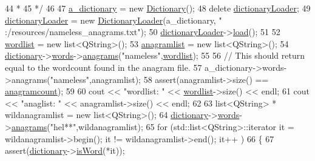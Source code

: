 \begin{DoxyCode}
44 \textcolor{comment}{         *}
45 \textcolor{comment}{         */}
46 
47         \hyperlink{class_unit_test_a81579d68baa8575bdf1625a0642eadf8}{a\_dictionary} = \textcolor{keyword}{new} \hyperlink{class_dictionary}{Dictionary}();
48         \textcolor{keyword}{delete} \hyperlink{class_unit_test_a9cf46138e9006b18b978f6a3126c8c50}{dictionaryLoader};
49         \hyperlink{class_unit_test_a9cf46138e9006b18b978f6a3126c8c50}{dictionaryLoader} = \textcolor{keyword}{new} \hyperlink{class_dictionary_loader}{DictionaryLoader}(a\_dictionary, \textcolor{stringliteral}{"
      :/resources/nameless\_anagrams.txt"});
50         \hyperlink{class_unit_test_a9cf46138e9006b18b978f6a3126c8c50}{dictionaryLoader}->\hyperlink{class_dictionary_loader_a1441785d7f5a848be0d7b7f432e338f8}{load}();
51 
52         \hyperlink{class_unit_test_aeb6acd51a206123112b000f6520ac25b}{wordlist} = \textcolor{keyword}{new} list<QString>();
53         \hyperlink{class_unit_test_aeb6e626c75d7caa5100aa605831a439f}{anagramlist} = \textcolor{keyword}{new} list<QString>();
54         \hyperlink{class_unit_test_a09902f0cb75bf2c03c56912ecd4682aa}{dictionary}->\hyperlink{class_dictionary_ac6c08127a37d8131fb8fb1e738406e85}{words}->\hyperlink{class_trie_aa42c01330538b67e0aff76068f02a8f7}{anagrams}(\textcolor{stringliteral}{"nameless"},\hyperlink{class_unit_test_aeb6acd51a206123112b000f6520ac25b}{wordlist});
55 
56         \textcolor{comment}{// This should return equal to the wordcount found in the anagram file.}
57         a\_dictionary->words->anagrams(\textcolor{stringliteral}{"nameless"},anagramlist);
58         assert(anagramlist->size() == \hyperlink{class_unit_test_a9e7b7ee73cb31ffb5b98bbb69a0aa999}{anagramcount});
59 
60         cout << \textcolor{stringliteral}{"wordlist: "} << \hyperlink{class_unit_test_aeb6acd51a206123112b000f6520ac25b}{wordlist}->size() << endl;
61         cout << \textcolor{stringliteral}{"anaglist: "} << anagramlist->size() << endl;
62 
63         list<QString> * wildanagramlist = \textcolor{keyword}{new} list<QString>();
64         \hyperlink{class_unit_test_a09902f0cb75bf2c03c56912ecd4682aa}{dictionary}->\hyperlink{class_dictionary_ac6c08127a37d8131fb8fb1e738406e85}{words}->\hyperlink{class_trie_aa42c01330538b67e0aff76068f02a8f7}{anagrams}(\textcolor{stringliteral}{"hel**"},wildanagramlist);
65         \textcolor{keywordflow}{for} (std::list<QString>::iterator it = wildanagramlist->begin(); it != wildanagramlist->end(); it++
      )
66         \{
67             assert(\hyperlink{class_unit_test_a09902f0cb75bf2c03c56912ecd4682aa}{dictionary}->\hyperlink{class_dictionary_afe2588ce04f6ad733c51df58a8d0d96b}{isWord}(*it));

\end{DoxyCode}
